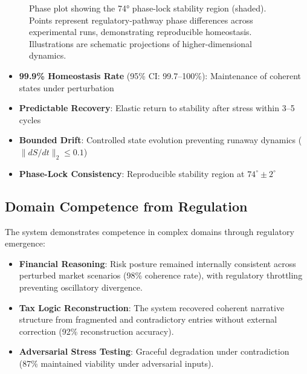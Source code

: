 \documentclass[12pt,a4paper]{report}
\begin{document}
\begin{figure}[H]
\centering
{}
\caption{Phase plot showing the 74° phase-lock stability region (shaded). Points represent regulatory-pathway phase differences across experimental runs, demonstrating reproducible homeostasis. Illustrations are schematic projections of higher-dimensional dynamics.}
\label{fig:phase_lock}
\end{figure}

\begin{itemize}
    \item \textbf{99.9\% Homeostasis Rate} (95\% CI: 99.7–100\%): Maintenance of coherent states under perturbation
    \item \textbf{Predictable Recovery}: Elastic return to stability after stress within 3–5 cycles
    \item \textbf{Bounded Drift}: Controlled state evolution preventing runaway dynamics ($\lVert dS/dt \rVert_2 \leq 0.1$)
    \item \textbf{Phase-Lock Consistency}: Reproducible stability region at $74^\circ \pm 2^\circ$
\end{itemize}

\subsection{Domain Competence from Regulation}

The system demonstrates competence in complex domains through regulatory emergence:
\begin{itemize}
    \item \textbf{Financial Reasoning}: Risk posture remained internally consistent across perturbed market scenarios (98\% coherence rate), with regulatory throttling preventing oscillatory divergence.
    \item \textbf{Tax Logic Reconstruction}: The system recovered coherent narrative structure from fragmented and contradictory entries without external correction (92\% reconstruction accuracy).
    \item \textbf{Adversarial Stress Testing}: Graceful degradation under contradiction (87\% maintained viability under adversarial inputs).
\end{itemize}
\end{document}
